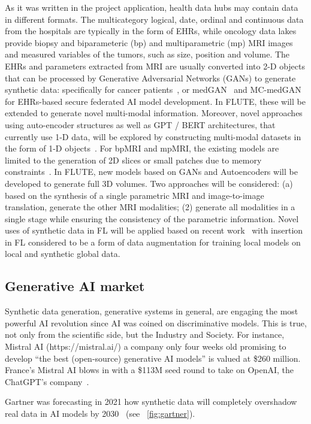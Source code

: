 \documentclass[a4paper,12pt]{article}
\begin{document}
As it was written in the project application, health data hubs may contain data in different formats. The multicategory logical, date, ordinal and continuous data from the hospitals are typically in the form of EHRs, while oncology data lakes provide biopsy and biparameteric (bp) and multiparametric (mp) MRI images and measured variables of the tumors, such as size, position and volume. The EHRs and parameters extracted from MRI are usually
converted into 2-D objects that can be processed by Generative Adversarial Networks (GANs) to generate synthetic
data: specifically for cancer patients~\cite{GonzalezAbriletal2021}, or medGAN~\cite{Choietal2017} and MC-medGAN~\cite{Caminoetal2018} for EHRs-based secure federated AI model development. In FLUTE, these will be extended to generate novel multi-modal information. Moreover, novel
approaches using auto-encoder structures as well as GPT / BERT architectures, that currently use 1-D data, will be
explored by constructing multi-modal datasets in the form of 1-D objects~\cite{Chenetal2020}. For bpMRI and mpMRI, the existing
models are limited to the generation of 2D slices or small patches due to memory constraints~\cite{Daretal2019}. In FLUTE, new
models based on GANs and Autoencoders will be developed to generate full 3D volumes. Two approaches will be
considered: (a) based on the synthesis of a single parametric MRI and image-to-image translation, generate the other
MRI modalities; (2) generate all modalities in a single stage while ensuring the consistency of the parametric information. Novel uses of synthetic data in FL will be applied based on recent work~\cite{Emametal2020} with insertion in FL considered
to be a form of data augmentation for training local models on local and synthetic global data.

\subsection{Generative AI market}
Synthetic data generation, generative systems in general, are engaging the most powerful AI revolution since AI was coined on discriminative models. This is true, not only from the scientific side, but the Industry and Society. For instance, Mistral AI (https://mistral.ai/) a company only four weeks old promising to develop ``the best (open-source) generative AI models'' is valued at \$260 million. France’s Mistral AI blows in with a \$113M seed round to take on OpenAI, the ChatGPT's company~\cite{BraAbb2023}.

Gartner was forecasting in 2021 how synthetic data will completely overshadow real data in AI models by 2030~\cite{Toews2023} (see \figurename~\ref{fig:gartner}).
\end{document}
